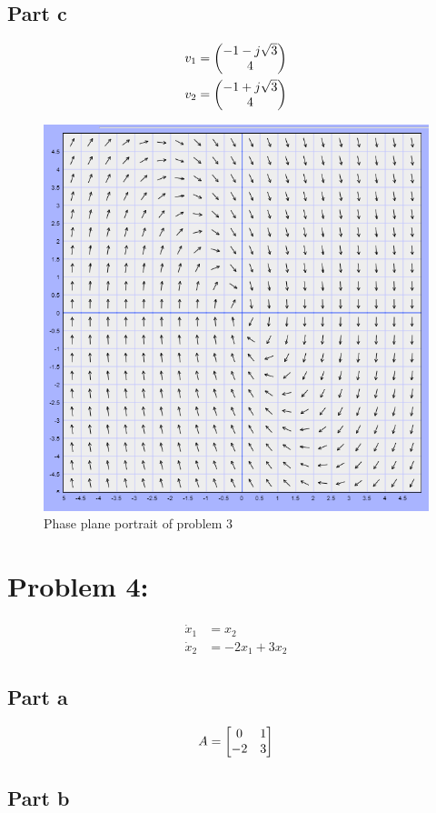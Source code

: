 \documentclass[]{article}
\begin{document}
\subsection{Part c}

\begin{align*}
	v_1 &= \mqty(-1 - j \sqrt{3}\\ 4)\\
	v_2 &= \mqty(-1 + j \sqrt{3}\\ 4)
\end{align*}

\begin{figure}[p]
	\centering
	\includegraphics[width=0.7\linewidth]{fig/pblm3}
	\caption{Phase plane portrait of problem 3}
	\label{fig:pblm3}
\end{figure}


\newpage
\section{Problem 4:}
\begin{align*}
	\dot{x}_1 &= x_2\\
	\dot{x}_2 &= - 2 x_1 + 3 x_2
\end{align*}

\subsection{Part a}
\begin{displaymath}
	A = \mqty[0&1\\-2&3]
\end{displaymath}

\subsection{Part b}
\end{document}
